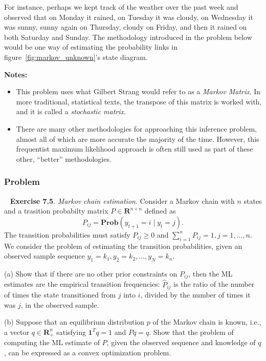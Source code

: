 \documentclass[12pt,reqno]{article}
\theoremstyle{definition}
\numberwithin{equation}{section}
\begin{document}
For instance, perhaps we kept
track of the weather over the past week and observed that on Monday it rained, on Tuesday it was cloudy,
on Wednesday it was sunny, sunny again on Thursday, cloudy on Friday, and then it rained on both Saturday and
Sunday. The methodology introduced in the problem below would be one way of estimating the probability links
in figure~\ref{fig:markov_unknown}'s state diagram.

\noindent \textbf{Notes:} 
\begin{itemize}
    \item This problem uses what Gilbert Strang would refer to as a \textit{Markov Matrix}. In 
    more traditional, statistical texts, the transpose of this matrix is worked with, and it is called a \textit{stochastic matrix}.
    \item There are many other methodologies for approaching this inference problem, almost all of which
    are more accurate the majority of the time. However, this frequentist maximum likelihood approach is often still used as
    part of these other, ``better'' methodologies.
\end{itemize}


\subsubsection*{Problem}
~\cite{boyd_convex_optimization} \textbf{Exercise 7.5}. \textit{Markov chain estimation}. Consider a Markov chain
with $n$ states and a trasition probabilty matrix $P \in \mathbf{R}^{n \times n}$ defined as
\[P_{ij} = \mathbf{Prob}\left(y_{t+1} = i \mid y_t = j\right).\]
The transition probabilities must satisfy $P_{i j} \geq 0$ and $\sum_{i=1}^n P_{i j}=1, j=1, \ldots, n$. We consider the problem of estimating the transition probabilities,
given an observed sample sequence $y_1=k_1, y_2=k_2, \ldots, y_N=k_n$.

\vspace{0.1cm}
\noindent (a) Show that if there are no other prior constraints on $P_{i j}$, then the ML estimates are the empirical transition frequencies:
$\hat{P}_{i j}$ is the ratio of the number of times the state transitioned from $j$ into $i$, divided by the number of times it was $j$, in the observed sample.

\vspace{0.1cm}
\noindent (b) Suppose that an equilibrium distribution $p$ of the Markov chain is known, i.e., a vector $q \in \mathbf{R}_{+}^n$ satisfying $\mathbf{1}^T q=1$ and $P q=q$. Show that the problem of computing the ML estimate of $P$,
given the observed sequence and knowledge of $q$, can be expressed as a convex optimization problem.
\end{document}
